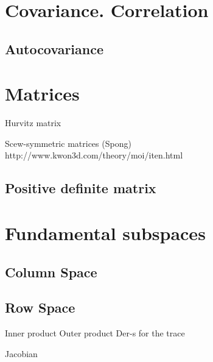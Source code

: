 \section*{Covariance. Correlation}
\subsection{Autocovariance}

\section{Matrices}

Hurvitz matrix

Scew-symmetric matrices (Spong)
http://www.kwon3d.com/theory/moi/iten.html

\subsection{Positive definite matrix}

\section{Fundamental subspaces}
\subsection{Column Space}
\subsection{Row Space}

Inner product
Outer product
Der-s for the trace



Jacobian
